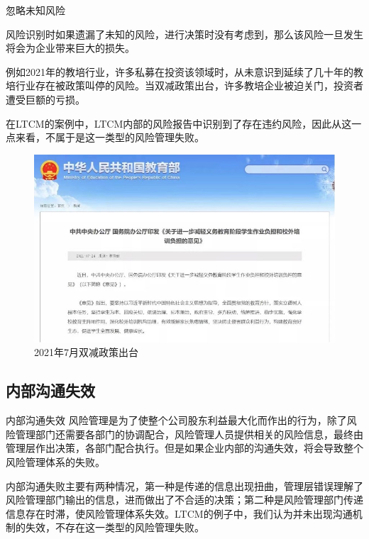 \begin{frame}{忽略未知风险}

    风险识别时如果遗漏了未知的风险，进行决策时没有考虑到，那么该风险一旦发生将会为企业带来巨大的损失。

    例如2021年的教培行业，许多私募在投资该领域时，从未意识到延续了几十年的教培行业存在被政策叫停的风险。当双减政策出台，许多教培企业被迫关门，投资者遭受巨额的亏损。

    在LTCM的案例中，LTCM内部的风险报告中识别到了存在违约风险，因此从这一点来看，不属于是这一类型的风险管理失败。
    \begin{figure}
        \centering
        \includegraphics[width=0.4\linewidth]{img/图片 1.jpg}
        \caption{2021年7月双减政策出台}
    \end{figure}

\end{frame}
\subsection{内部沟通失效}\label{sec:3}
\begin{frame}{内部沟通失效}
    风险管理是为了使整个公司股东利益最大化而作出的行为，除了风险管理部门还需要各部门的协调配合，风险管理人员提供相关的风险信息，最终由管理层作出决策，各部门配合执行。但是如果企业内部的沟通失效，将会导致整个风险管理体系的失败。

    内部沟通失败主要有两种情况，第一种是传递的信息出现扭曲，管理层错误理解了风险管理部门输出的信息，进而做出了不合适的决策；第二种是风险管理部门传递信息存在时滞，使风险管理体系失效。LTCM的例子中，我们认为并未出现沟通机制的失效，不存在这一类型的风险管理失败。
\end{frame}
